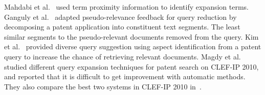 Mahdabi et al.~\cite{Mahdabi2013} used term proximity
information to identify expansion terms. Ganguly et
al.~\cite{ganguly2011patent} adapted pseudo-relevance feedback for
query reduction by decomposing a patent application into constituent
text segments.
The least similar
segments to the pseudo-relevant documents removed from the query.
Kim et al.~\cite{kim2014diversifying} provided diverse query suggestion using
aspect identification from a patent query to increase the chance of
retrieving relevant documents. Magdy et al.~\cite{magdy2011study} 
studied different query expansion techniques for patent search on CLEF-IP 2010, 
and reported that it is difficult to get improvement with automatic methods. 
They also compare the best two systems in CLEF-IP 2010
in~\cite{magdy2011simple}.
\begin{comment}
discussed that standard query expansion techniques are
less effective in patent retrieval, where the initial query is the full texts of query
patents. 
\end{comment}












